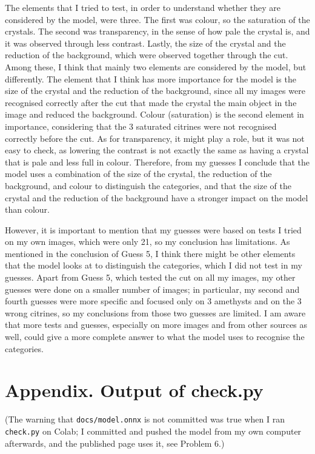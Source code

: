 \documentclass[11pt]{article}
\begin{document}
The elements that I tried to test, in order to understand whether they are
considered by the model, were three. The first was colour, so the saturation of
the crystals. The second was transparency, in the sense of how pale the crystal
is, and it was observed through less contrast. Lastly, the size of the crystal
and the reduction of the background, which were observed together through the
cut. Among these, I think that mainly two elements are considered by the model,
but differently. The element that I think has more importance for the model is
the size of the crystal and the reduction of the background, since all my images
were recognised correctly after the cut that made the crystal the main object in
the image and reduced the background. Colour (saturation) is the second element
in importance, considering that the 3 saturated citrines were not recognised
correctly before the cut. As for transparency, it might play a role, but it was
not easy to check, as lowering the contrast is not exactly the same as having a
crystal that is pale and less full in colour. Therefore, from my guesses I
conclude that the model uses a combination of the size of the crystal, the
reduction of the background, and colour to distinguish the categories, and that
the size of the crystal and the reduction of the background have a stronger
impact on the model than colour.

However, it is important to mention that my guesses were based on tests I tried
on my own images, which were only 21, so my conclusion has limitations. As
mentioned in the conclusion of Guess 5, I think there might be other elements
that the model looks at to distinguish the categories, which I did not test in my
guesses. Apart from Guess 5, which tested the cut on all my images, my other
guesses were done on a smaller number of images; in particular, my second and
fourth guesses were more specific and focused only on 3 amethysts and on the 3
wrong citrines, so my conclusions from those two guesses are limited. I am aware
that more tests and guesses, especially on more images and from other sources as
well, could give a more complete answer to what the model uses to recognise the
categories.

\section*{Appendix. Output of check.py}

(The warning that \texttt{docs/model.onnx} is not committed was true when I ran
\texttt{check.py} on Colab; I committed and pushed the model from my own computer
afterwards, and the published page uses it, see Problem 6.)

\end{document}
